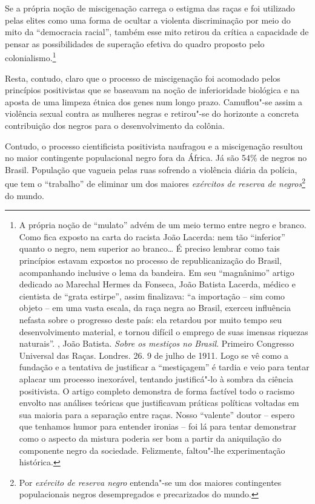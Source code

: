 Se a própria noção de miscigenação carrega o estigma das raças e foi
utilizado pelas elites como uma forma de ocultar a violenta
discriminação por meio do mito da ``democracia racial'', também esse
mito retirou da crítica a capacidade de pensar as possibilidades de
superação efetiva do quadro proposto pelo colonialismo.\footnote{A
  própria noção de ``mulato'' advém de um meio termo entre negro e
  branco. Como fica exposto na carta do racista João Lacerda: nem tão
  ``inferior'' quanto o negro, nem superior ao branco\ldots{} É preciso
  lembrar como tais princípios estavam expostos no processo de
  republicanização do Brasil, acompanhando inclusive o lema da bandeira.
  Em seu ``magnânimo'' artigo dedicado ao Marechal Hermes da Fonseca,
  João Batista Lacerda, médico e cientista de ``grata estirpe'', assim
  finalizava: ``a importação -- sim como objeto -- em uma vasta escala,
  da raça negra ao Brasil, exerceu influência nefasta sobre o progresso
  deste país: ela retardou por muito tempo seu desenvolvimento material,
  e tornou difícil o emprego de suas imensas riquezas naturais''.
  , João Batista. \emph{Sobre os mestiços no Brasil}. Primeiro
  Congresso Universal das Raças. Londres. 26. 9 de julho de 1911. Logo
  se vê como a fundação e a tentativa de justificar a ``mestiçagem'' é
  tardia e veio para tentar aplacar um processo inexorável, tentando
  justificá"-lo à sombra da ciência positivista. O artigo completo
  demonstra de forma factível todo o racismo envolto nas análises
  teóricas que justificavam práticas políticas voltadas em sua maioria
  para a separação entre raças. Nosso ``valente'' doutor -- espero que
  tenhamos humor para entender ironias -- foi lá para tentar demonstrar
  como o aspecto da mistura poderia ser bom a partir da aniquilação do
  componente negro da sociedade. Felizmente, faltou"-lhe experimentação
  histórica.}

Resta, contudo, claro que o processo de miscigenação foi acomodado pelos
princípios positivistas que se baseavam na noção de inferioridade
biológica e na aposta de uma limpeza étnica dos genes num longo prazo.
Camuflou"-se assim a violência sexual contra as mulheres negras e
retirou"-se do horizonte a concreta contribuição dos negros para o
desenvolvimento da colônia.

Contudo, o processo cientificista positivista naufragou e a miscigenação
resultou no maior contingente populacional negro fora da África. Já são
54\% de negros no Brasil. População que vagueia pelas ruas sofrendo a
violência diária da polícia, que tem o ``trabalho'' de eliminar um dos
maiores \emph{exércitos de reserva de negros}\footnote{Por
  \emph{exército de reserva negro} entenda"-se um dos maiores
  contingentes populacionais negros desempregados e precarizados do
  mundo.} do mundo.

